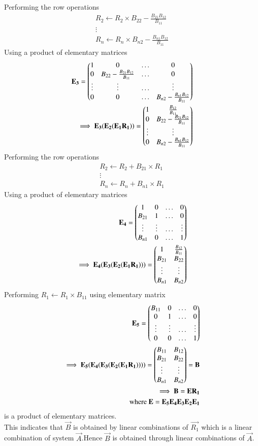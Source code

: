 \documentclass[journal,12pt,twocolumn]{IEEEtran}
\begin{document}
Performing the row operations
\begin{align}
  R_2\leftarrow R_2\times B_{22}-\frac{B_{21}B_{12}}{B_{11}}\\
  \vdots\\
   R_n\leftarrow R_n\times B_{n2}-\frac{B_{n1}B_{12}}{B_{11}}
\end{align}
 Using a product of elementary matrices
 \begin{align}
  \mathbf{E_3}=\begin{pmatrix}1&0&\hdots&0\\0& B_{22}-\frac{B_{21}B_{12}}{B_{11}}&\hdots&0\\\vdots&\vdots&\hdots&\vdots\\0&0&\hdots&B_{n2}-\frac{B_{n1}B_{12}}{B_{11}}\end{pmatrix}\\
 \implies \mathbf{E_3}(\mathbf{E_2}(\mathbf{E_1}\mathbf{R_1}))=\begin{pmatrix}1&\frac{B_{12}}{B_{11}}\\0&B_{22}-\frac{B_{21}B_{12}}{B_{11}}\\ \vdots & \vdots \\0&B_{n2}-\frac{B_{n1}B_{12}}{B_{11}}\end{pmatrix}
\end{align}
Performing the row operations
\begin{align}
  R_2\leftarrow R_2+B_{21} \times R_1 \\
  \vdots\\
   R_n\leftarrow R_n+B_{n1} \times R_1
\end{align}
 Using a product of elementary matrices
 \begin{align}
  \mathbf{E_4}=\begin{pmatrix}1&0&\hdots&0\\B_{21}& 1&\hdots&0\\\vdots&\vdots&\hdots&\vdots\\B_{n1}&0&\hdots&1\end{pmatrix}\\
  \implies \mathbf{E_4}(\mathbf{E_3}(\mathbf{E_2}(\mathbf{E_1}\mathbf{R_1})))=\begin{pmatrix}1&\frac{B_{12}}{B_{11}}\\B_{21}&B_{22}\\ \vdots & \vdots \\B_{n1}&B_{n2}\end{pmatrix}
\end{align}
Performing $R_1 \leftarrow R_1\times B_{11}$ using elementary matrix
\begin{align}
  \mathbf{E_5}=\begin{pmatrix}B_{11}&0&\hdots&0\\0& 1&\hdots&0\\\vdots&\vdots&\hdots&\vdots\\0&0&\hdots&1\end{pmatrix}\\
  \implies \mathbf{E_5}(\mathbf{E_4}(\mathbf{E_3}(\mathbf{E_2}(\mathbf{E_1}\mathbf{R_1}))))=\begin{pmatrix}B_{11}&B_{12}\\B_{21}&B_{22}\\ \vdots & \vdots \\B_{n1}&B_{n2}\end{pmatrix}=\mathbf{B}\\
  \implies \mathbf{B}=\mathbf{E}\mathbf{R_1}\\
 \text{ where  }\mathbf{E}=\mathbf{E_5}\mathbf{E_4}\mathbf{E_3}\mathbf{E_2}\mathbf{E_1}
\end{align}
is a product of elementary matrices.\\
This indicates that $\vec{B}$ is obtained by linear combinations of $\vec{R_1}$ which is a linear combination of system $\vec{A}$.Hence $\vec{B}$ is obtained through linear combinations of $\vec{A}$.
\end{document}
